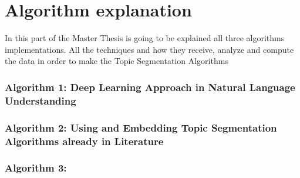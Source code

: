 \chapter{Algorithm explanation}
\label{chapter:chapter03}


In this part of the Master Thesis is going to be explained all three algorithms implementations. All the techniques and how they receive, analyze and compute the data in order to make the Topic Segmentation Algorithms

\subsection{Algorithm 1: Deep Learning Approach in Natural Language Understanding}


\subsection{Algorithm 2: Using and Embedding Topic Segmentation Algorithms already in Literature}

\subsection{Algorithm 3: }